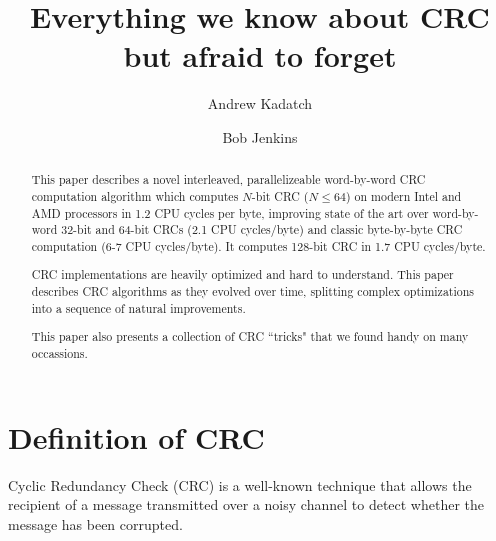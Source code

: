 \documentclass{article}
\begin{document}
\lstset{
basicstyle=\footnotesize, %
numbers=left, %
numberstyle=\footnotesize, %
stepnumber=1, %
frame=single,
framerule=1pt,
captionpos=b, %
showstringspaces=false, %
showspaces=false, %
showtabs=false, %
breaklines=true %
}

\def\CRC{{\rm CRC}_u}
\def\SCRC{{\rm CRC}_0}
\def\BYTE{{\rm BYTE}}
\def\LCD{{\rm LCD}}
\def\CrcWord{{\rm CrcWord}}

\def\remove#1{}

\title{Everything we know about CRC but afraid to forget}
\author[1]{Andrew Kadatch}
\author[2]{Bob Jenkins}
\maketitle

\begin{abstract}
  This paper describes a novel interleaved, parallelizeable word-by-word
  CRC computation algorithm which computes $N$-bit CRC ($N \leq 64$) on
  modern Intel and AMD processors in 1.2 CPU cycles per byte, improving
  state of the art over word-by-word 32-bit and 64-bit CRCs (2.1 CPU
  cycles/byte) and classic byte-by-byte CRC computation (6-7 CPU cycles/byte).
  It computes 128-bit CRC in 1.7 CPU cycles/byte.

  CRC implementations are heavily optimized and hard to understand. This
  paper describes CRC algorithms as they evolved over time, splitting
  complex optimizations into a sequence of natural improvements.

  This paper also presents a collection of CRC ``tricks" that we found
  handy on many occassions.
\end{abstract}

\tableofcontents


\section{Definition of CRC}

Cyclic Redundancy Check (CRC) is a well-known technique that allows the
recipient of a message transmitted over a noisy channel to detect whether
the message has been corrupted.
\end{document}
